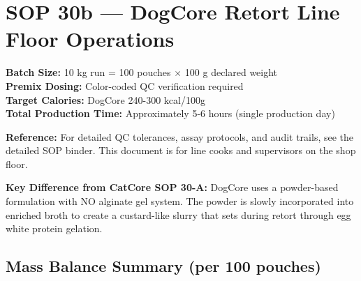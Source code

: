 
\section*{SOP 30b --- DogCore Retort Line Floor Operations}
\label{sop:dogcore_retort_line}

\textbf{Batch Size:} 10 kg run = 100 pouches $\times$ 100 g declared weight \\
\textbf{Premix Dosing:} Color-coded QC verification required \\
\textbf{Target Calories:} DogCore 240-300 kcal/100g \\
\textbf{Total Production Time:} Approximately 5-6 hours (single production day)

\vspace{1em}
\noindent\textbf{Reference:} For detailed QC tolerances, assay protocols, and audit trails, see the detailed SOP binder. This document is for line cooks and supervisors on the shop floor.

\vspace{1em}
\noindent\textbf{Key Difference from CatCore SOP 30-A:} DogCore uses a powder-based formulation with NO alginate gel system. The powder is slowly incorporated into enriched broth to create a custard-like slurry that sets during retort through egg white protein gelation.

\vspace{1em}


\subsection*{Mass Balance Summary (per 100 pouches)}

